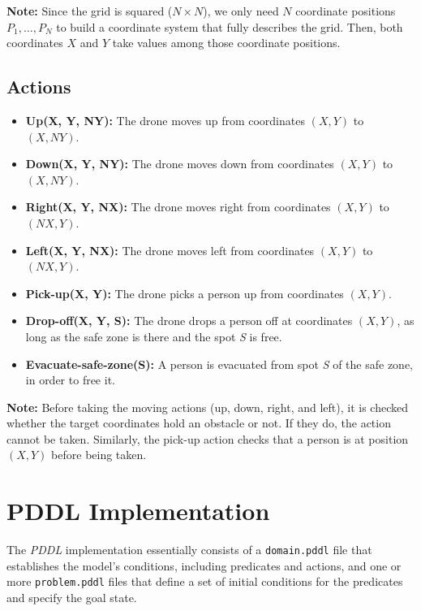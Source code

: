 \documentclass{article}
\begin{document}
\textbf{Note:} Since the grid is squared (\(N \times N\)), we only need \(N\) coordinate positions \(P_1, \ldots, P_N\) to build a coordinate system that fully describes the grid. Then, both coordinates \(X\) and \(Y\) take values among those coordinate positions.

\subsection{Actions}

\begin{itemize}[label=--, itemsep=0.05em]
    \item \textbf{Up(X, Y, NY):} The drone moves up from coordinates \((X, Y)\) to \((X, NY)\).
    \item \textbf{Down(X, Y, NY):} The drone moves down from coordinates \((X, Y)\) to \((X, NY)\).
    \item \textbf{Right(X, Y, NX):} The drone moves right from coordinates \((X, Y)\) to \((NX, Y)\).
    \item \textbf{Left(X, Y, NX):} The drone moves left from coordinates \((X, Y)\) to \((NX, Y)\).
    \item \textbf{Pick-up(X, Y):} The drone picks a person up from coordinates \((X, Y)\).
    \item \textbf{Drop-off(X, Y, S):} The drone drops a person off at coordinates \((X, Y)\), as long as the safe zone is there and the spot \textit{S} is free.
    \item \textbf{Evacuate-safe-zone(S):} A person is evacuated from spot \textit{S} of the safe zone, in order to free it.
\end{itemize}

\textbf{Note:} Before taking the moving actions (up, down, right, and left), it is checked whether the target coordinates hold an obstacle or not. If they do, the action cannot be taken. Similarly, the pick-up action checks that a person is at position \((X, Y)\) before being taken.

\section{PDDL Implementation}

The \textit{PDDL} implementation essentially consists of a \texttt{domain.pddl} file that establishes the model’s conditions, including predicates and actions, and one or more \texttt{problem.pddl} files that define a set of initial conditions for the predicates and specify the goal state.
\end{document}
